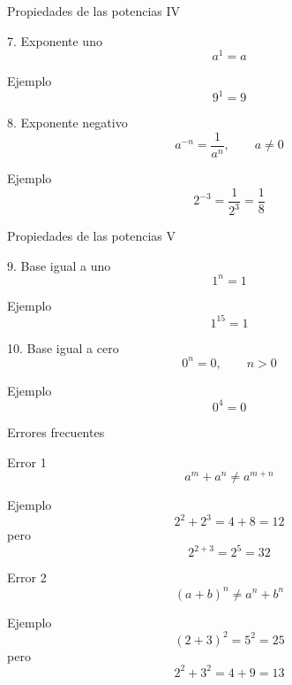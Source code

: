 \documentclass[aspectratio=169,10pt,handout]{beamer}
\newcommand{\pp}{\pause}
\begin{document}
	\begin{frame}{Propiedades de las potencias IV}
		\begin{block}{7. Exponente uno}
			\[
			a^1 = a
			\]
		\end{block}
		
		\begin{exampleblock}{Ejemplo}
			\[
			9^1 = 9
			\]
		\end{exampleblock}
		
		\pp
		
		\begin{block}{8. Exponente negativo}
			\[
			a^{-n}=\frac{1}{a^n}, \qquad a\neq 0
			\]
		\end{block}
		
		\begin{exampleblock}{Ejemplo}
			\[
			2^{-3}=\frac{1}{2^3}=\frac{1}{8}
			\]
		\end{exampleblock}
	\end{frame}
	
	\begin{frame}{Propiedades de las potencias V}
		\begin{block}{9. Base igual a uno}
			\[
			1^n=1
			\]
		\end{block}
		
		\begin{exampleblock}{Ejemplo}
			\[
			1^{15}=1
			\]
		\end{exampleblock}
		
		\pp
		
		\begin{block}{10. Base igual a cero}
			\[
			0^n=0, \qquad n>0
			\]
		\end{block}
		
		\begin{exampleblock}{Ejemplo}
			\[
			0^4=0
			\]
		\end{exampleblock}
	\end{frame}
	
	\begin{frame}{Errores frecuentes}
		\begin{alertblock}{Error 1}
			\[
			a^m + a^n \neq a^{m+n}
			\]
		\end{alertblock}
		
		\begin{exampleblock}{Ejemplo}
			\[
			2^2+2^3 = 4+8=12
			\]
			pero
			\[
			2^{2+3}=2^5=32
			\]
		\end{exampleblock}
		
		\pp
		
		\begin{alertblock}{Error 2}
			\[
			(a+b)^n \neq a^n+b^n
			\]
		\end{alertblock}
		
		\begin{exampleblock}{Ejemplo}
			\[
			(2+3)^2=5^2=25
			\]
			pero
			\[
			2^2+3^2=4+9=13
			\]
		\end{exampleblock}
	\end{frame}
	
\end{document}

